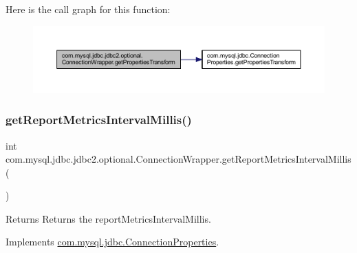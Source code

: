 Here is the call graph for this function\+:
\nopagebreak
\begin{figure}[H]
\begin{center}
\leavevmode
\includegraphics[width=350pt]{classcom_1_1mysql_1_1jdbc_1_1jdbc2_1_1optional_1_1_connection_wrapper_ab225f27eb5edd605b97f1a646b503144_cgraph}
\end{center}
\end{figure}
\mbox{\label{classcom_1_1mysql_1_1jdbc_1_1jdbc2_1_1optional_1_1_connection_wrapper_a5f6c8e0cebe816e8612a1b3bdd418e3e}} 
\subsubsection{\texorpdfstring{get\+Report\+Metrics\+Interval\+Millis()}{getReportMetricsIntervalMillis()}}
{\footnotesize\ttfamily int com.\+mysql.\+jdbc.\+jdbc2.\+optional.\+Connection\+Wrapper.\+get\+Report\+Metrics\+Interval\+Millis (\begin{DoxyParamCaption}{ }\end{DoxyParamCaption})}

\begin{DoxyReturn}{Returns}
Returns the report\+Metrics\+Interval\+Millis. 
\end{DoxyReturn}


Implements \mbox{\hyperlink{interfacecom_1_1mysql_1_1jdbc_1_1_connection_properties_aac4f74c781305ad6b2eb71913e184de3}{com.\+mysql.\+jdbc.\+Connection\+Properties}}.

